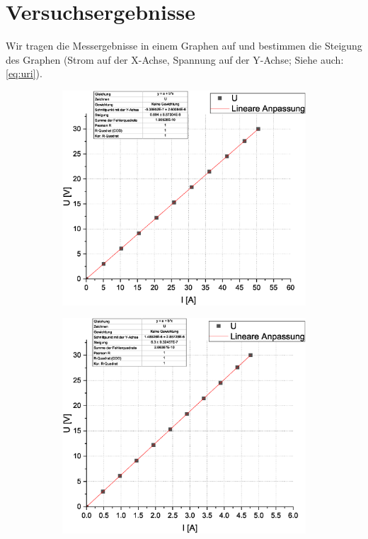 \documentclass[10pt,a4paper]{article}
\begin{document}
\section{Versuchsergebnisse}
\begin{flushleft}
Wir tragen die Messergebnisse in einem Graphen auf und bestimmen die Steigung des Graphen (Strom auf der X-Achse, Spannung auf der Y-Achse; Siehe auch: \ref{eq:uri}).
\begin{figure}[H]
\centering
\begin{subfigure}[c]{.5\textwidth}
\centering
\includegraphics[scale=0.25]{R1}
\label{fig:r1}
\end{subfigure}%
%
\begin{subfigure}[c]{.5\textwidth}
\centering
\includegraphics[scale=0.25]{R2}
\label{fig:r2}
\end{subfigure}%


\end{figure}
\end{flushleft}
\end{document}
